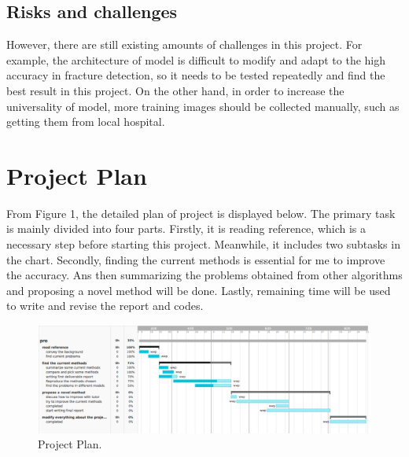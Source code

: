 \documentclass[12pt,oneside,a4paper]{article}
\begin{document}
\subsection{Risks and challenges}
However, there are still existing amounts of challenges in this project. For example, the architecture of model is difficult to modify and adapt to the high accuracy in fracture detection, so it needs to be tested repeatedly and find the best result in this project. On the other hand, in order to increase the universality of model, more training images should be collected manually, such as getting them from local hospital.

\section{Project Plan}
From Figure 1, the detailed plan of project is displayed below. The primary task is mainly divided into four parts. Firstly, it is reading reference, which is a necessary step before starting this project. Meanwhile, it includes two subtasks in the chart. Secondly, finding the current methods is essential for me to improve the accuracy. Ans then summarizing the problems obtained from other algorithms and proposing a novel method will be done. Lastly, remaining time will be used to write and revise the report and codes.
\begin{figure}
\begin{center}
\includegraphics[width=1\columnwidth]{images/TaskGantt.png}
\caption{Project Plan.}
\end{center}
\end{figure}
\end{document}

